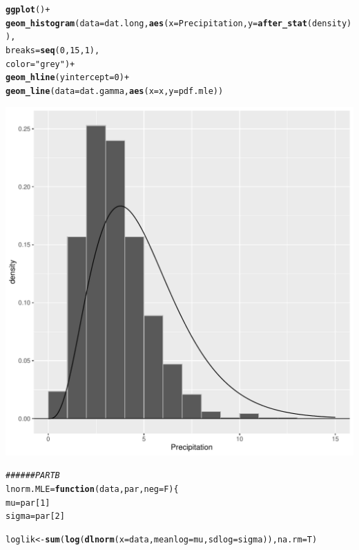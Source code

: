 \documentclass{article}\usepackage[]{graphicx}\usepackage[]{xcolor}
\makeatletter
\def\maxwidth{ %
  \ifdim\Gin@nat@width>\linewidth
    \linewidth
  \else
    \Gin@nat@width
  \fi
}
\newcommand{\hlnum}[1]{\textcolor[rgb]{0.686,0.059,0.569}{#1}}%
\newcommand{\hlsng}[1]{\textcolor[rgb]{0.192,0.494,0.8}{#1}}%
\newcommand{\hlcom}[1]{\textcolor[rgb]{0.678,0.584,0.686}{\textit{#1}}}%
\newcommand{\hlopt}[1]{\textcolor[rgb]{0,0,0}{#1}}%
\newcommand{\hldef}[1]{\textcolor[rgb]{0.345,0.345,0.345}{#1}}%
\newcommand{\hlkwa}[1]{\textcolor[rgb]{0.161,0.373,0.58}{\textbf{#1}}}%
\newcommand{\hlkwb}[1]{\textcolor[rgb]{0.69,0.353,0.396}{#1}}%
\newcommand{\hlkwc}[1]{\textcolor[rgb]{0.333,0.667,0.333}{#1}}%
\newcommand{\hlkwd}[1]{\textcolor[rgb]{0.737,0.353,0.396}{\textbf{#1}}}%
\newenvironment{kframe}{%
 \def\at@end@of@kframe{}%
 \ifinner\ifhmode%
  \def\at@end@of@kframe{\end{minipage}}%
  \begin{minipage}{\columnwidth}%
 \fi\fi%
 \def\FrameCommand##1{\hskip\@totalleftmargin \hskip-\fboxsep
 \colorbox{shadecolor}{##1}\hskip-\fboxsep
     \hskip-\linewidth \hskip-\@totalleftmargin \hskip\columnwidth}%
 \MakeFramed {\advance\hsize-\width
   \@totalleftmargin\z@ \linewidth\hsize
   \@setminipage}}%
 {\par\unskip\endMakeFramed%
 \at@end@of@kframe}
\newenvironment{knitrout}{}{} %
\makeatother
\begin{document}
\begin{enumerate}
\begin{knitrout}
\begin{kframe}
\begin{alltt}
\hlkwd{ggplot}\hldef{()} \hlopt{+}
  \hlkwd{geom_histogram}\hldef{(}\hlkwc{data} \hldef{= dat.long,} \hlkwd{aes}\hldef{(}\hlkwc{x} \hldef{= Precipitation,} \hlkwc{y} \hldef{=} \hlkwd{after_stat}\hldef{(density)),}
  \hlkwc{breaks}\hldef{=}\hlkwd{seq}\hldef{(}\hlnum{0}\hldef{,} \hlnum{15}\hldef{,} \hlnum{1}\hldef{),}
  \hlkwc{color}\hldef{=}\hlsng{"grey"}\hldef{)}\hlopt{+}
  \hlkwd{geom_hline}\hldef{(}\hlkwc{yintercept} \hldef{=} \hlnum{0}\hldef{)}\hlopt{+}
  \hlkwd{geom_line}\hldef{(}\hlkwc{data} \hldef{= dat.gamma,} \hlkwd{aes}\hldef{(}\hlkwc{x} \hldef{= x,} \hlkwc{y} \hldef{= pdf.mle))}
\end{alltt}
\end{kframe}
\includegraphics[width=\maxwidth]{figure/unnamed-chunk-2-1} 
\begin{kframe}\begin{alltt}
  \hlcom{###### PART B}
\hldef{lnorm.MLE} \hlkwb{=} \hlkwa{function}\hldef{(}\hlkwc{data}\hldef{,} \hlkwc{par}\hldef{,} \hlkwc{neg}\hldef{=F)\{}
  \hldef{mu} \hlkwb{=} \hldef{par[}\hlnum{1}\hldef{]}
  \hldef{sigma} \hlkwb{=} \hldef{par[}\hlnum{2}\hldef{]}

  \hldef{loglik} \hlkwb{<-} \hlkwd{sum}\hldef{(}\hlkwd{log}\hldef{(}\hlkwd{dlnorm}\hldef{(}\hlkwc{x}\hldef{=data,} \hlkwc{meanlog} \hldef{= mu,} \hlkwc{sdlog} \hldef{= sigma)),} \hlkwc{na.rm} \hldef{= T)}


\end{alltt}
\end{kframe}
\end{knitrout}
\end{enumerate}
\end{document}
